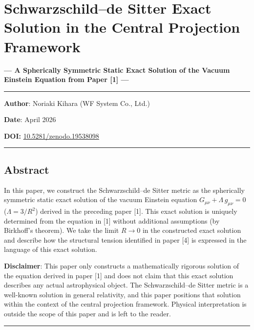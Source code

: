 \documentclass[a4paper,11pt]{article}
\theoremstyle{definition}
\begin{document}
\section{Schwarzschild--de Sitter Exact Solution in the Central
Projection
Framework}\label{schwarzschildde-sitter-exact-solution-in-the-central-projection-framework}

\textbf{--- A Spherically Symmetric Static Exact Solution of the Vacuum
Einstein Equation from Paper {[}1{]} ---}

\begin{center}\rule{0.5\linewidth}{0.5pt}\end{center}

\textbf{Author}: Noriaki Kihara (WF System Co., Ltd.)

\textbf{Date}: April 2026

\textbf{DOI:}
\href{https://doi.org/10.5281/zenodo.19538098}{10.5281/zenodo.19538098}

\begin{center}\rule{0.5\linewidth}{0.5pt}\end{center}

\subsection{Abstract}\label{abstract}

In this paper, we construct the Schwarzschild--de Sitter metric as the
spherically symmetric static exact solution of the vacuum Einstein
equation \(G_{\mu\nu} + \Lambda\, g_{\mu\nu} = 0\) (\(\Lambda = 3/R^2\))
derived in the preceding paper {[}1{]}. This exact solution is uniquely
determined from the equation in {[}1{]} without additional assumptions
(by Birkhoff's theorem). We take the limit \(R \to 0\) in the
constructed exact solution and describe how the structural tension
identified in paper {[}4{]} is expressed in the language of this exact
solution.

\textbf{Disclaimer}: This paper only constructs a mathematically
rigorous solution of the equation derived in paper {[}1{]} and does not
claim that this exact solution describes any actual astrophysical
object. The Schwarzschild--de Sitter metric is a well-known solution in
general relativity, and this paper positions that solution within the
context of the central projection framework. Physical interpretation is
outside the scope of this paper and is left to the reader.

\begin{center}\rule{0.5\linewidth}{0.5pt}\end{center}
\end{document}
